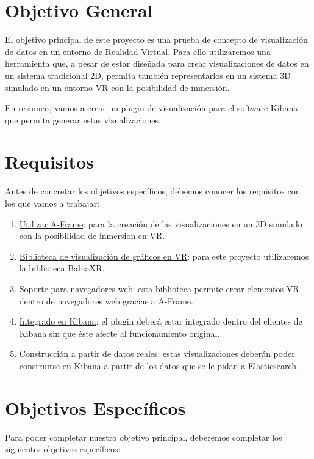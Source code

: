 \documentclass[a4paper, 12pt]{book}
\begin{document}
\section{Objetivo General}
\label{sec:objetivogeneral}

El objetivo principal de este proyecto es una prueba de concepto de visualización de datos en un entorno de Realidad Virtual. Para ello utilizaremos una herramienta que, a pesar de estar diseñada para crear visualizaciones de datos en un sistema tradicional 2D, permita también representarlos en un sistema 3D simulado en un entorno VR con la posibilidad de inmersión.

En resumen, vamos a crear un plugin de visualización para el software Kibana que permita generar estas visualizaciones.

\section{Requisitos}
\label{sec:requisitos}
Antes de concretar los objetivos específicos, debemos conocer los requisitos con los que vamos a trabajar:

\begin{enumerate}
    \item \underline{Utilizar A-Frame}: para la creación de las visualizaciones en un 3D simulado con la posibilidad de inmersion en VR.
    \item \underline{Biblioteca de visualización de gráficos en VR}: para este proyecto utilizaremos la biblioteca BabiaXR.
    \item \underline{Soporte para navegadores web}: esta biblioteca permite crear elementos VR dentro de navegadores web gracias a A-Frame. 
    \item \underline{Integrado en Kibana}: el plugin deberá estar integrado dentro del clientes de Kibana sin que éste afecte al funcionamiento original.
    \item \underline{Construcción a partir de datos reales}: estas visualizaciones deberán poder construirse en Kibana a partir de los datos que se le pidan a Elasticsearch.
\end{enumerate}


\section{Objetivos Específicos}
\label{sec:objetivosespecificos}

Para poder completar nuestro objetivo principal, deberemos completar los siguientes objetivos específicos:
\end{document}
